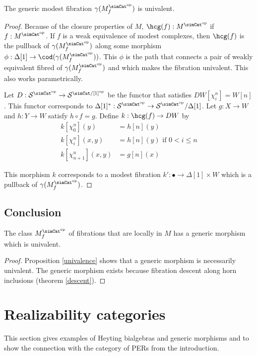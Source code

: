 \documentclass{tac}
\newcommand\cat\mathcal
\newcommand\ri{^*}
\newcommand\dual{^{\mathrm{op}}}
\newcommand\s{^{\simCat\dual}}
\newcommand\of{:}
\newcommand\simplex\Delta
\newcommand\f{_f}
\newcommand\gen\gamma
\begin{document}
\begin{proposition} The generic modest fibration $\gen(M\s\f)$ is univalent. \label{univalence} \end{proposition}

\begin{proof} Because of the closure properties of $M$, $\hcg(f)\of M\s$ if $f\of M\s$. If $f$ is a weak equivalence of modest complexes, then $\hcg(f)$ is the pullback of $\gen(M\s\f)$ along some morphism $\phi\of\simplex[1]\to\cod(\gen(M\s\f))$. This $\phi$ is the path that connects a pair of weakly equivalent fibred of $\gen(M\s\f)$ and which makes the fibration univalent. This also works parametrically.

Let $D\of \cat S\s\to \cat S^{\simCat/[1]\dual}$ be the functor that satisfies $DW[\chi^n_i]=W[n]$. This functor corresponds to $\simplex[1]\ri\of \cat S\s\to \cat S\s/\simplex[1]$. Let $g\of X\to W$ and $h\of Y\to W$ satisfy $h\circ f=g$. Define $k\of\hcg(f) \to DW$ by
\begin{align*}
k[\chi^n_0](y) &= h[n](y)\\
k[\chi^n_i](x,y) &= h[n](y) \textrm{ if $0<i\leq n$}\\
k[\chi^n_{n+1}](x,y) &= g[n](x)
\end{align*}

This morphism $k$ corresponds to a modest fibration $k'\of\bullet\to \simplex[1]\times W$ which is a pullback of $\gen(M\s\f)$.
\end{proof}

\subsection{Conclusion}

\begin{theorem} The class $M\s\f$ of fibrations that are locally in $M$ has a generic morphism which is univalent. \label{univalent universe}\end{theorem} 

\begin{proof} Proposition \ref{univalence} shows that a generic morphism is necessarily univalent. The generic morphism exists because fibration descent along horn inclusions (theorem \ref{descent}). \end{proof}

\section{Realizability categories}
This section gives examples of Heyting bialgebras and generic morphisms and to show the connection with the category of PERs from the introduction.
\end{document}
